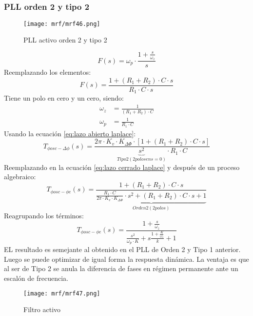 \documentclass[
	12pt, %
	fleqn, %
	a4paper, %
	oneside, %
]{LegrandOrangeBook}
\begin{document}
\subsubsection{PLL orden 2 y tipo 2}
\begin{wrapfigure}{r}{0.5\linewidth}
  \begin{center}
    \texttt{[image: mrf/mrf46.png]}
  \end{center}
  \caption{PLL activo orden 2 y tipo 2}
\end{wrapfigure}
\begin{displaymath}
F(s)=\omega_p\cdot\frac{1+\frac{s}{\omega_z}}{s}
\end{displaymath}
Reemplazando los elementos:
\begin{displaymath}
F(s)=\frac{1+(R_1+R_2)\cdot C\cdot s}{R_1\cdot C\cdot s}
\end{displaymath}
Tiene un polo en cero y un cero, siendo:
\begin{align*}
\omega_z&=\frac{1}{(R_1+R_2)\cdot C}\\
\omega_p&=\frac{1}{R_1\cdot C}
\end{align*}
Usando la ecuación \ref{eq:lazo abierto laplace}:
\begin{displaymath}
T_{\phi osc-\Delta\phi}(s)=\frac{2\pi\cdot K_v\cdot K_{\Delta\Phi}\cdot\left[1+(R_1+R_2)\cdot C\cdot s\right]}{\underbrace{s^2}_{Tipo 2 (2 polos en s=0)}\cdot R_1\cdot C}
\end{displaymath}
Reemplazando en la ecuación \ref{eq:lazo cerrado laplace} y después de un proceso algebraico:
\begin{displaymath}
T_{\phi osc-\phi e}(s)=\frac{1+(R_1+R_2)\cdot C\cdot s}{\underbrace{\frac{R_1\cdot C}{2\pi\cdot K_v\cdot K_{\Delta\Phi}}\cdot s^2+(R_1+R_2)\cdot C\cdot s+1}_{Orden 2(2 polos)}}
\end{displaymath}
Reagrupando los términos:
\begin{displaymath}
T_{\phi osc-\phi e}(s)=\frac{1+\frac{s}{\omega_z}}{\frac{s^2}{\omega_p\cdot K}+s\frac{1+\frac{K}{\omega_z}}{k}+1}
\end{displaymath}
EL resultado es semejante al obtenido en el PLL de Orden 2 y Tipo 1 anterior. Luego se puede optimizar de igual forma la respuesta dinámica. La ventaja es que al ser de Tipo 2 se anula la diferencia de fases en régimen permanente ante un escalón de frecuencia.\\
\begin{wrapfigure}{r}{0.5\linewidth}
  \begin{center}
    \texttt{[image: mrf/mrf47.png]}
  \end{center}
  \caption{Filtro activo}
  \label{fig:opam filtro}
\end{wrapfigure}
\end{document}
